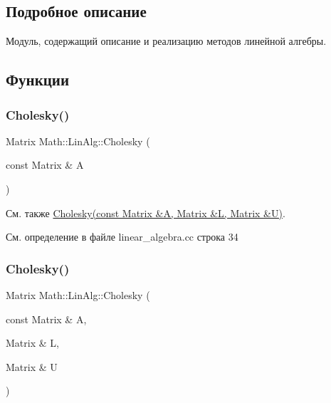 \subsection{Подробное описание}
Модуль, содержащий описание и реализацию методов линейной алгебры. 

\subsection{Функции}
\hypertarget{namespace_math_1_1_lin_alg_a63d9cc41c4735dc5cefd2ec8880f432c}{}\label{namespace_math_1_1_lin_alg_a63d9cc41c4735dc5cefd2ec8880f432c} 
\subsubsection{\texorpdfstring{Cholesky()}{Cholesky()}\hspace{0.1cm}{\footnotesize\ttfamily [1/2]}}
{\footnotesize\ttfamily Matrix Math\+::\+Lin\+Alg\+::\+Cholesky (\begin{DoxyParamCaption}\item[{const Matrix \&}]{A }\end{DoxyParamCaption})}

\begin{DoxySeeAlso}{См. также}
\hyperlink{namespace_math_1_1_lin_alg_a980590dcd2dcd5557b299e7b5dfc1946}{Cholesky(const Matrix \&\+A, Matrix \&\+L, Matrix \&\+U)}. 
\end{DoxySeeAlso}


См. определение в файле linear\+\_\+algebra.\+cc строка 34

\hypertarget{namespace_math_1_1_lin_alg_a980590dcd2dcd5557b299e7b5dfc1946}{}\label{namespace_math_1_1_lin_alg_a980590dcd2dcd5557b299e7b5dfc1946} 
\subsubsection{\texorpdfstring{Cholesky()}{Cholesky()}\hspace{0.1cm}{\footnotesize\ttfamily [2/2]}}
{\footnotesize\ttfamily Matrix Math\+::\+Lin\+Alg\+::\+Cholesky (\begin{DoxyParamCaption}\item[{const Matrix \&}]{A,  }\item[{Matrix \&}]{L,  }\item[{Matrix \&}]{U }\end{DoxyParamCaption})}



